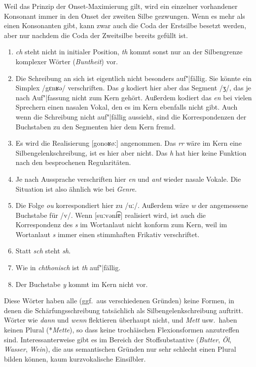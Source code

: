 \label{sol:phonologischeschreibprinzipien05} Weil das Prinzip der Onset-Maximierung gilt, wird ein einzelner vorhandener Konsonant immer in den Onset der zweiten Silbe gezwungen.
Wenn es mehr als einen Konsonanten gibt, kann zwar auch die Coda der Erstsilbe besetzt werden, aber nur nachdem die Coda der Zweitsilbe bereits gefüllt ist.

\label{sol:phonologischeschreibprinzipien06}

\begin{enumerate}
  \item \textit{ch} steht nicht in initialer Position, \textit{th} kommt sonst nur an der Silbengrenze komplexer Wörter (\textit{Buntheit}) vor.
  \item Die Schreibung an sich ist eigentlich nicht besonders auf"|fällig.
    Sie könnte ein Simplex /gɛnʁə/ verschriften.
    Das \textit{g} kodiert hier aber das Segment /ʒ/, das je nach Auf"|fassung nicht zum Kern gehört.
    Außerdem kodiert das \textit{en} bei vielen Sprechern einen nasalen Vokal, den es im Kern ebenfalls nicht gibt.
    Auch wenn die Schreibung nicht auf"|fällig aussieht, sind die Korrespondenzen der Buchstaben zu den Segmenten hier dem Kern fremd.
  \item Es wird die Realisierung [gonoʁøː] angenommen.
    Das \textit{rr} wäre im Kern eine Silbengelenkschreibung, ist es hier aber nicht.
    Das \textit{h} hat hier keine Funktion nach den besprochenen Regularitäten.
  \item Je nach Aussprache verschriften hier \textit{en} und \textit{ant} wieder nasale Vokale.
    Die Situation ist also ähnlich wie bei \textit{Genre}.
  \item Die Folge \textit{ou} korrespondiert hier zu /uː/.
    Außerdem wäre \textit{w} der angemessene Buchstabe für /v/.
    Wenn [suːvəni͡ɐ] realisiert wird, ist auch die Korrespondenz des \textit{s} im Wortanlaut nicht konform zum Kern, weil im Wortanlaut \textit{s} immer einen stimmhaften Frikativ verschriftet.
  \item Statt \textit{sch} steht \textit{sh}.
  \item Wie in \textit{chthonisch} ist \textit{th} auf"|fällig.
  \item Der Buchstabe \textit{y} kommt im Kern nicht vor.
\end{enumerate}


\label{sol:morphosyntaktischeschreibprinzipien01} Diese Wörter haben alle (ggf.\ aus verschiedenen Gründen) keine Formen, in denen die Schärfungsschreibung tatsächlich als Silbengelenkschreibung auftritt.
Wörter wie \textit{dann} und \textit{wenn} flektieren überhaupt nicht, und \textit{Mett} usw.\ haben keinen Plural (*\textit{Mette}), so dass keine trochäischen Flexionsformen anzutreffen sind.
Interessanterweise gibt es im Bereich der Stoffsubstantive (\textit{Butter}, \textit{Öl}, \textit{Wasser}, \textit{Wein}), die aus semantischen Gründen nur sehr schlecht einen Plural bilden können, kaum kurzvokalische Einsilbler.

